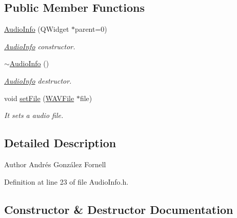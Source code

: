 \subsection*{Public Member Functions}
\begin{DoxyCompactItemize}
\item 
\hyperlink{class_audio_info_ad24c69ecc331c48790cdf2886c721132}{Audio\+Info} (Q\+Widget $\ast$parent=0)
\begin{DoxyCompactList}\small\item\em \hyperlink{class_audio_info}{Audio\+Info} constructor. \end{DoxyCompactList}\item 
\mbox{\label{class_audio_info_ae6b316306b98617ceda7624bb04138fd}} 
\hyperlink{class_audio_info_ae6b316306b98617ceda7624bb04138fd}{$\sim$\+Audio\+Info} ()
\begin{DoxyCompactList}\small\item\em \hyperlink{class_audio_info}{Audio\+Info} destructor. \end{DoxyCompactList}\item 
void \hyperlink{class_audio_info_a2d05a12b4191202227e17afc5e57f349}{set\+File} (\hyperlink{class_w_a_v_file}{W\+A\+V\+File} $\ast$file)
\begin{DoxyCompactList}\small\item\em It sets a audio file. \end{DoxyCompactList}\end{DoxyCompactItemize}


\subsection{Detailed Description}
\begin{DoxyAuthor}{Author}
Andrés González Fornell 
\end{DoxyAuthor}


Definition at line 23 of file Audio\+Info.\+h.



\subsection{Constructor \& Destructor Documentation}
\mbox{\label{class_audio_info_ad24c69ecc331c48790cdf2886c721132}} 
